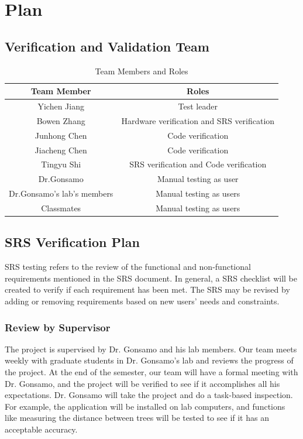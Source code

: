 \documentclass[12pt, titlepage]{article}
\begin{document}
\newpage

\section{Plan}

\subsection{Verification and Validation Team}
\begin{table}[H]
    \centering
    \begin{tabular}{|c|c|}
    \hline
         Team Member  & Roles\\
         \hline
         Yichen Jiang & Test leader\\
         \hline
         Bowen Zhang  & Hardware verification and SRS verification\\
         \hline
         Junhong Chen & Code verification\\
         \hline
         Jiacheng Chen & Code verification\\
         \hline
         Tingyu Shi & SRS verification and Code verification\\
         \hline
         Dr.Gonsamo & Manual testing as user\\
         \hline
         Dr.Gonsamo's lab's members  & Manual testing as users\\
         \hline
         Classmates & Manual testing as users\\
         \hline
    \end{tabular}
    \caption{Team Members and Roles}
\end{table}

\subsection{SRS Verification Plan}
SRS testing refers to the review of the functional and 
non-functional requirements mentioned in the SRS document. In 
general, a SRS checklist will be created to verify if each
requirement has been met. The SRS may be revised by adding or
removing requirements based on new users' needs and constraints.

\subsubsection{Review by Supervisor}
The project is supervised by Dr. Gonsamo and his lab members. Our 
team meets weekly with graduate students in Dr. Gonsamo's lab and 
reviews the progress of the project.
At the end of the semester, our team will have a formal meeting
with Dr. Gonsamo, and the project will be verified to see if it 
accomplishes all his expectations.  Dr. Gonsamo will take the 
project and do a task-based inspection. For example, the 
application will be installed on lab computers, and functions like 
measuring the distance between trees will be tested to see if it has 
an acceptable accuracy.
\end{document}
